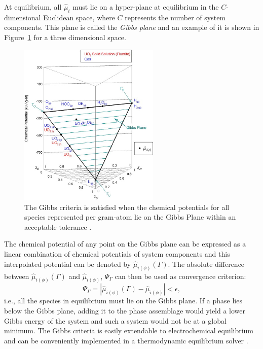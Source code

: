 \begin{enumerate}
	 At equilibrium, all $\hat{\mu}_{i}$ must lie on a hyper-plane at equilibrium in the $C$-dimensional Euclidean space, where $C$ represents the number of system components. This plane is called the \emph{Gibbs plane} and an example of it is shown in Figure~\ref{fig:GibbsPlane} for a three dimensional space.
	 \begin{figure}[ht!]
		\centering
		\includegraphics[width=0.6\textwidth]{figures/chapter-4/Gibbs_plane.jpg}
		\caption[The Gibbs criteria is satisfied when the chemical potentials for all species represented per gram-atom lie on the Gibbs Plane within an acceptable tolerance.]{The Gibbs criteria is satisfied when the chemical potentials for all species represented per gram-atom lie on the Gibbs Plane within an acceptable tolerance \cite{Piro11a}.}
		\label{fig:GibbsPlane}
	\end{figure}

	The chemical potential of any point on the Gibbs plane can be expressed as a linear combination of  chemical potentials of system components and this interpolated potential can be denoted by $\hat{\mu}_{i(\phi)}(\Gamma)$. The absolute difference between $\hat{\mu}_{i(\phi)}(\Gamma)$ and $\hat{\mu}_{i(\phi)}$, $\Psi_{\Gamma}$ can then be used as convergence criterion:
		\begin{equation}\label{eqn:convGC}
			\Psi_{\Gamma} = \left \vert  \hat{\mu}_{i(\phi)}(\Gamma) - \hat{\mu}_{i(\phi)} \right \vert < \epsilon,
		\end{equation}
	 i.e., all the species in equilibrium must lie on the Gibbs plane. If a phase lies below the Gibbs plane, adding it to the phase assemblage would yield a lower Gibbs energy of the system and such a system would not be at a global minimum. The Gibbs criteria is easily extendable to electrochemical equilibrium and can be conveniently implemented in a thermodynamic equilibrium solver \cite{Piro11a}.
	 \end{enumerate}
	 

